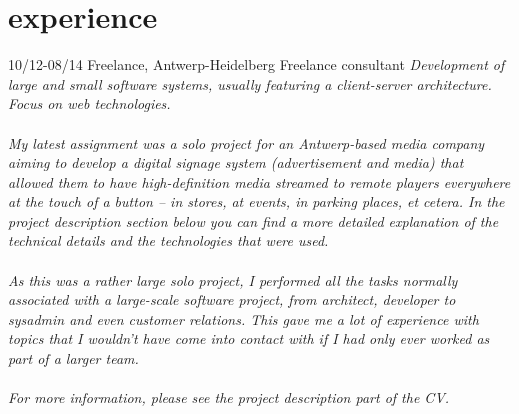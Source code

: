 \documentclass[]{friggeri-cv}
\begin{document}
\section{experience}

\begin{entrylist}
  \entry
    {10/12-08/14}
    {Freelance, Antwerp-Heidelberg}
    {Freelance consultant}
    {\emph{Development of large and small software systems, usually featuring a client-server architecture. Focus on web technologies. \\\\ My latest assignment was a solo project for an Antwerp-based media company aiming to develop a digital signage system (advertisement and media) that allowed them to have high-definition media streamed to remote players everywhere at the touch of a button -- in stores, at events, in parking places, et cetera. In the project description section below you can find a more detailed explanation of the technical details and the technologies that were used. \\\\ As this was a rather large solo project, I performed all the tasks normally associated with a large-scale software project, from architect, developer to sysadmin and even customer relations. This gave me a lot of experience with topics that I wouldn't have come into contact with if I had only ever worked as part of a larger team. \\\\ For more information, please see the project description part of the CV.
    }}
\end{entrylist}

\end{document}
